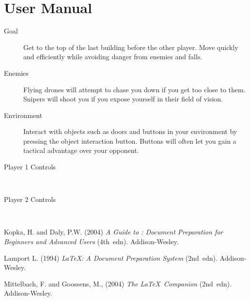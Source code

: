 \documentclass[11pt,a4paper]{article}
\newcommand{\itab}[1]{\hspace{0em}\rlap{#1}}
\newcommand{\tab}[1]{\hspace{.2\textwidth}\rlap{#1}}
\begin{document}
\newpage
\section*{User Manual}
\label{ss:user-manual}
\begin{description}
	\item [Goal] Get to the top of the last building before the other player. Move quickly and efficiently while avoiding danger from enemies and falls.
	\item [Enemies] Flying drones will attempt to chase you down if you get too close to them. Snipers will shoot you if you expose yourself in their field of vision.
	\item [Environment] Interact with objects such as doors and buttons in your environment by pressing the object interaction button. Buttons will often let you gain a tactical advantage over your opponent.
	\item [Player 1 Controls]\hfill \\
	\item [Player 2 Controls]\hfill \\
\end{description}
\newpage
\begin{thebibliography}{9}

Kopka, H. and Daly, P.W.  (2004) \textit{A Guide to \LaTeXe:
Document Preparation for Beginners and Advanced Users} (4th~edn).
Addison-Wesley.

Lamport L. (1994) \textit{\LaTeX: A Document Preparation System}
(2nd~edn). Addison-Wesley.

Mittelbach, F. and Goossens, M., (2004) \textit{The \LaTeX\
Companion} (2nd~edn). Addison-Wesley.
\end{thebibliography}
\end{document}
